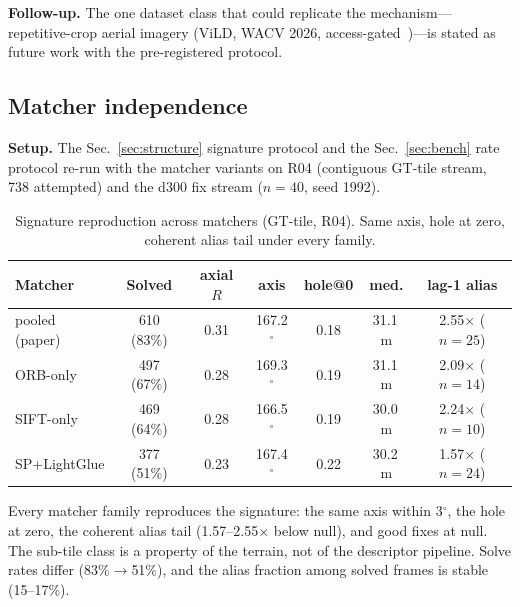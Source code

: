 \documentclass[journal]{IEEEtran}
\begin{document}
\textbf{Follow-up.} The one dataset class that could replicate the mechanism---repetitive-crop aerial imagery (ViLD, WACV 2026, access-gated~\cite{vild})---is stated as future work with the pre-registered protocol.

\subsection{Matcher independence}
\label{sec:matcher}

\textbf{Setup.} The Sec.~\ref{sec:structure} signature protocol and the Sec.~\ref{sec:bench} rate protocol re-run with the matcher variants on R04 (contiguous GT-tile stream, 738 attempted) and the d300 fix stream ($n=40$, seed 1992).

\begin{table}[t]
\caption{Signature reproduction across matchers (GT-tile, R04). Same axis, hole at zero, coherent alias tail under every family.}
\label{tab:matchersig}
\centering
\footnotesize
\setlength{\tabcolsep}{3pt}
\begin{tabular}{@{}lcccccc@{}}
\toprule
Matcher & Solved & axial $R$ & axis & hole@0 & med. & lag-1 alias \\
\midrule
pooled (paper) & 610 (83\%) & 0.31 & 167.2$^{\circ}$ & 0.18 & 31.1\,m & 2.55$\times$ ($n{=}25$) \\
ORB-only & 497 (67\%) & 0.28 & 169.3$^{\circ}$ & 0.19 & 31.1\,m & 2.09$\times$ ($n{=}14$) \\
SIFT-only & 469 (64\%) & 0.28 & 166.5$^{\circ}$ & 0.19 & 30.0\,m & 2.24$\times$ ($n{=}10$) \\
SP+LightGlue & 377 (51\%) & 0.23 & 167.4$^{\circ}$ & 0.22 & 30.2\,m & 1.57$\times$ ($n{=}24$) \\
\bottomrule
\end{tabular}
\end{table}

Every matcher family reproduces the signature: the same axis within 3$^{\circ}$, the hole at zero, the coherent alias tail (1.57--2.55$\times$ below null), and good fixes at null. The sub-tile class is a property of the terrain, not of the descriptor pipeline. Solve rates differ (83\%$\to$51\%), and the alias fraction among solved frames is stable (15--17\%).
\end{document}
